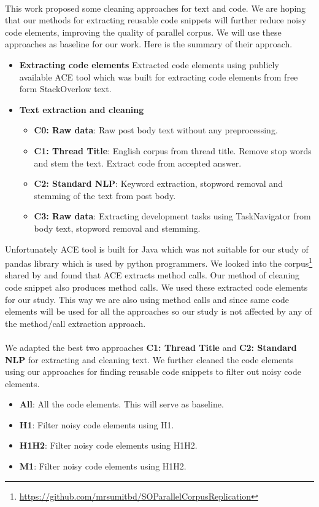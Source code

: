 \\
This work \cite{Rahman:2019_CleaningStackOverflowforMT} proposed some cleaning approaches for text and code. We are hoping that our methods for extracting reusable code snippets will further reduce noisy code elements, improving the quality of parallel corpus. We will use these approaches as baseline for our work. Here is the summary of their approach.
\begin{itemize}
    \item \textbf{Extracting code elements} Extracted code elements using publicly available ACE tool \cite{Rigby:2013_DiscoveringEC} which was built for extracting code elements from free form StackOverlow text.
    \item \textbf{Text extraction and cleaning}
\begin{itemize}
    \item \textbf{C0: Raw data}: Raw post body text without any preprocessing. 
    \item \textbf{C1: Thread Title}: English corpus from thread title. Remove stop words and stem the text. Extract code from accepted answer.
    \item \textbf{C2: Standard NLP}: Keyword extraction, stopword removal and stemming of the text from post body.
    \item \textbf{C3: Raw data}: Extracting development tasks using TaskNavigator \cite{Treude:2015_TaskNav} from body text, stopword removal and stemming.
\end{itemize}
\end{itemize}

Unfortunately ACE tool is built for Java which was not suitable for our study of pandas library which is used by python programmers. We looked into the corpus\footnote{\url{https://github.com/mrsumitbd/SOParallelCorpusReplication}} shared by \cite{Rahman:2019_CleaningStackOverflowforMT} and found that ACE extracts method calls. Our method of cleaning code snippet also produces method calls. We used these extracted code elements for our study. This way we are also using method calls and since same code elements will be used for all the approaches so our study is not affected by any of the method/call extraction approach.\\\\
We adapted the best two approaches \textbf{C1: Thread Title} and \textbf{C2: Standard NLP} for extracting and cleaning text. We further cleaned the code elements using our approaches for finding reusable code snippets to filter out noisy code elements.
\begin{itemize}
    \item \textbf{All}: All the code elements. This will serve as baseline.
    \item \textbf{H1}: Filter noisy code elements using H1.
    \item \textbf{H1H2}: Filter noisy code elements using H1H2.
    \item \textbf{M1}: Filter noisy code elements using H1H2.
\end{itemize}
